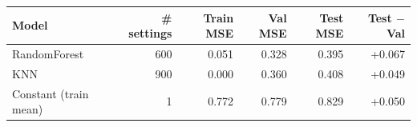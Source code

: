 \begin{tabular}{lrrrrr}
\toprule
Model & \# settings & Train MSE & Val MSE & Test MSE & Test $-$ Val \\
\midrule
RandomForest & 600 & 0.051 & 0.328 & 0.395 & +0.067 \\
KNN & 900 & 0.000 & 0.360 & 0.408 & +0.049 \\
Constant (train mean) & 1 & 0.772 & 0.779 & 0.829 & +0.050 \\
\bottomrule
\end{tabular}
